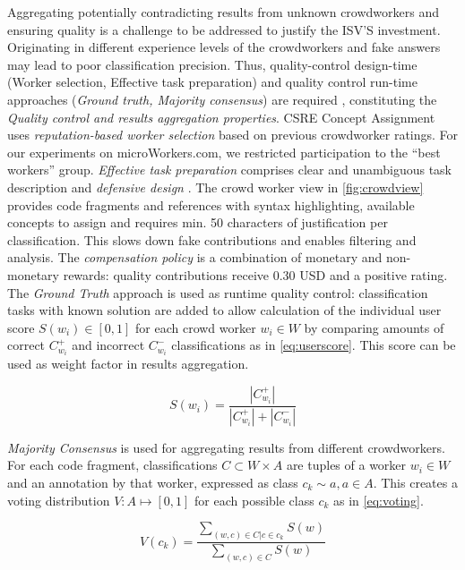 Aggregating potentially contradicting results from unknown crowdworkers and ensuring quality is a challenge \autocite{Stol2014,Weidema2016CrowdDesign,Nebeling2012} to be addressed to justify the ISV'S investment.
Originating in different experience levels of the crowdworkers and fake answers may lead to poor classification precision.
Thus, quality-control design-time (Worker selection, Effective task preparation) and quality control run-time approaches (\emph{Ground truth, Majority consensus}) are required \autocite{Allahbakhsh2013}, constituting the \emph{Quality control and results aggregation properties}.
CSRE Concept Assignment uses \emph{reputation-based worker selection} based on previous crowdworker ratings.
For our experiments on microWorkers.com, we restricted participation to the ``best workers'' group.
\emph{Effective task preparation} comprises clear and unambiguous task description and \emph{defensive design} \autocite{Allahbakhsh2013}.
The crowd worker view in \cref{fig:crowdview} provides code fragments and references with syntax highlighting, available concepts to assign and requires min.
50 characters of justification per classification.
This slows down fake contributions and enables filtering and analysis.
The \emph{compensation policy} is a combination of monetary and non-monetary rewards: quality contributions receive 0.30 USD and a positive rating.
The \emph{Ground Truth} approach is used as runtime quality control: classification tasks with known solution are added to allow calculation of the individual user score \(S(w_i) \in [0,1]\) for each crowd worker \(w_i\in W\) by comparing amounts of correct \(C^+_{w_i}\) and incorrect \(C^-_{w_i}\) classifications as in \cref{eq:userscore}.
This score can be used as weight factor in results aggregation.

\begin{equation}S(w_i) = \frac{|C^+_{w_i}|}{|C^+_{w_i}| + |C^-_{w_i}|}\label{eq:userscore}\end{equation}

\emph{Majority Consensus} is used for aggregating results from different crowdworkers.
For each code fragment, classifications \(C\subset W \times A\) are tuples of a worker \(w_i \in W\) and an annotation by that worker, expressed as class \(c_k \sim a, a\in A\).
This creates a voting distribution \(V: A \mapsto [0,1]\) for each possible class \(c_k\) as in \cref{eq:voting}.

\begin{equation}V(c_k) = \frac{\sum\limits_{(w,c)\in C | c \in c_k} S(w)}{\sum\limits_{(w,c)\in C} S(w)}\label{eq:voting}\end{equation}

